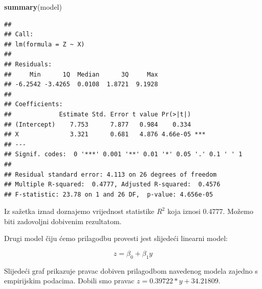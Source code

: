 \documentclass[]{article}
\newenvironment{Shaded}{\begin{snugshade}}{\end{snugshade}}
\newcommand{\KeywordTok}[1]{\textcolor[rgb]{0.13,0.29,0.53}{\textbf{{#1}}}}
\newcommand{\DataTypeTok}[1]{\textcolor[rgb]{0.13,0.29,0.53}{{#1}}}
\newcommand{\StringTok}[1]{\textcolor[rgb]{0.31,0.60,0.02}{{#1}}}
\newcommand{\NormalTok}[1]{{#1}}
\begin{document}
\begin{Shaded}
\begin{Highlighting}[]
\KeywordTok{summary}\NormalTok{(model)}
\end{Highlighting}
\end{Shaded}

\begin{verbatim}
## 
## Call:
## lm(formula = Z ~ X)
## 
## Residuals:
##     Min      1Q  Median      3Q     Max 
## -6.2542 -3.4265  0.0108  1.8721  9.1928 
## 
## Coefficients:
##             Estimate Std. Error t value Pr(>|t|)    
## (Intercept)    7.753      7.877   0.984    0.334    
## X              3.321      0.681   4.876 4.66e-05 ***
## ---
## Signif. codes:  0 '***' 0.001 '**' 0.01 '*' 0.05 '.' 0.1 ' ' 1
## 
## Residual standard error: 4.113 on 26 degrees of freedom
## Multiple R-squared:  0.4777, Adjusted R-squared:  0.4576 
## F-statistic: 23.78 on 1 and 26 DF,  p-value: 4.656e-05
\end{verbatim}

Iz sažetka iznad doznajemo vrijednost statistike \(R^2\) koja iznosi
0.4777. Možemo biti zadovoljni dobivenim rezultatom.

Drugi model čiju ćemo prilagodbu provesti jest slijedeći linearni model:

\begin{equation}
z = \beta_0 + \beta_1 y
\end{equation}

\begin{Shaded}
\end{Shaded}

Slijedeći graf prikazuje pravac dobiven prilagodbom navedenog modela
zajedno s empirijskim podacima. Dobili smo pravac
\(z = 0.39722*y + 34.21809\).

\begin{Shaded}
\end{Shaded}
\end{document}
